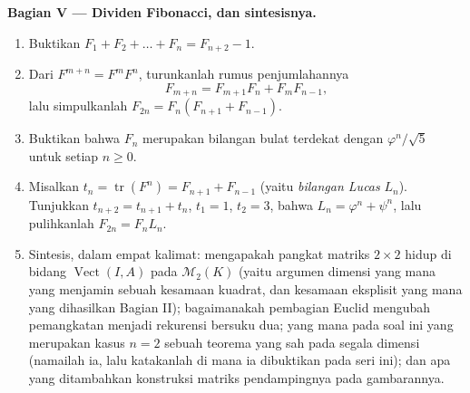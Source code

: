\begin{problem}
\medskip
\noindent\textbf{Bagian V --- Dividen Fibonacci, dan sintesisnya.}
\begin{enumerate}[resume]
  \item Buktikan $F_1 + F_2 + \dots + F_n = F_{n+2} - 1$.
  \item Dari $F^{m+n} = F^m F^n$, turunkanlah rumus penjumlahannya
        \[
        F_{m+n} = F_{m+1}F_n + F_m F_{n-1},
        \]
        lalu simpulkanlah $F_{2n} = F_n(F_{n+1} + F_{n-1})$.
  \item Buktikan bahwa $F_n$ merupakan bilangan bulat terdekat dengan
        $\varphi^n/\sqrt5$ untuk setiap $n \geq 0$.
  \item Misalkan $t_n = \operatorname{tr}(F^n) = F_{n+1} + F_{n-1}$
        (yaitu \emph{bilangan Lucas} $L_n$). Tunjukkan $t_{n+2} =
        t_{n+1} + t_n$, $t_1 = 1$, $t_2 = 3$, bahwa $L_n =
        \varphi^n + \psi^n$, lalu pulihkanlah $F_{2n} = F_n L_n$.
  \item Sintesis, dalam empat kalimat: mengapakah pangkat matriks $2
        \times 2$ hidup di bidang
        $\operatorname{Vect}(I, A)$ pada $\mathcal{M}_2(K)$ (yaitu argumen
        dimensi yang mana yang menjamin sebuah kesamaan kuadrat, dan
        kesamaan eksplisit yang mana yang dihasilkan Bagian II); bagaimanakah pembagian
        Euclid mengubah pemangkatan menjadi rekurensi
        bersuku dua;  yang mana pada soal ini yang merupakan kasus $n =
        2$ sebuah teorema yang sah pada segala dimensi (namailah ia,
        lalu katakanlah di mana ia dibuktikan pada seri ini); dan apa yang
        ditambahkan konstruksi matriks pendampingnya pada gambarannya.

\end{enumerate}
\end{problem}
